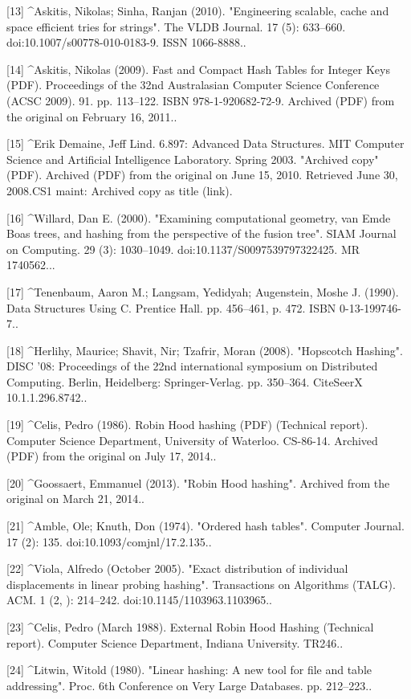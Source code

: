 [13]
^Askitis, Nikolas; Sinha, Ranjan (2010). "Engineering scalable, cache and space efficient tries for strings". The VLDB Journal. 17 (5): 633–660. doi:10.1007/s00778-010-0183-9. ISSN 1066-8888..

[14]
^Askitis, Nikolas (2009). Fast and Compact Hash Tables for Integer Keys (PDF). Proceedings of the 32nd Australasian Computer Science Conference (ACSC 2009). 91. pp. 113–122. ISBN 978-1-920682-72-9. Archived (PDF) from the original on February 16, 2011..

[15]
^Erik Demaine, Jeff Lind. 6.897: Advanced Data Structures. MIT Computer Science and Artificial Intelligence Laboratory. Spring 2003. "Archived copy" (PDF). Archived (PDF) from the original on June 15, 2010. Retrieved June 30, 2008.CS1 maint: Archived copy as title (link).

[16]
^Willard, Dan E. (2000). "Examining computational geometry, van Emde Boas trees, and hashing from the perspective of the fusion tree". SIAM Journal on Computing. 29 (3): 1030–1049. doi:10.1137/S0097539797322425. MR 1740562...

[17]
^Tenenbaum, Aaron M.; Langsam, Yedidyah; Augenstein, Moshe J. (1990). Data Structures Using C. Prentice Hall. pp. 456–461, p. 472. ISBN 0-13-199746-7..

[18]
^Herlihy, Maurice; Shavit, Nir; Tzafrir, Moran (2008). "Hopscotch Hashing". DISC '08: Proceedings of the 22nd international symposium on Distributed Computing. Berlin, Heidelberg: Springer-Verlag. pp. 350–364. CiteSeerX 10.1.1.296.8742..

[19]
^Celis, Pedro (1986). Robin Hood hashing (PDF) (Technical report). Computer Science Department, University of Waterloo. CS-86-14. Archived (PDF) from the original on July 17, 2014..

[20]
^Goossaert, Emmanuel (2013). "Robin Hood hashing". Archived from the original on March 21, 2014..

[21]
^Amble, Ole; Knuth, Don (1974). "Ordered hash tables". Computer Journal. 17 (2): 135. doi:10.1093/comjnl/17.2.135..

[22]
^Viola, Alfredo (October 2005). "Exact distribution of individual displacements in linear probing hashing". Transactions on Algorithms (TALG). ACM. 1 (2, ): 214–242. doi:10.1145/1103963.1103965..

[23]
^Celis, Pedro (March 1988). External Robin Hood Hashing (Technical report). Computer Science Department, Indiana University. TR246..

[24]
^Litwin, Witold (1980). "Linear hashing: A new tool for file and table addressing". Proc. 6th Conference on Very Large Databases. pp. 212–223..

